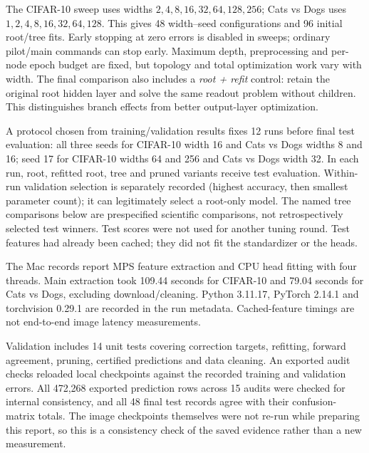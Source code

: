 \documentclass[11pt,a4paper]{article}
\begin{document}
The CIFAR-10 sweep uses widths $2,4,8,16,32,64,128,256$; Cats vs Dogs uses $1,2,4,8,16,32,64,128$. This gives 48 width--seed configurations and 96 initial root/tree fits. Early stopping at zero errors is disabled in sweeps; ordinary pilot/main commands can stop early. Maximum depth, preprocessing and per-node epoch budget are fixed, but topology and total optimization work vary with width. The final comparison also includes a \emph{root + refit} control: retain the original root hidden layer and solve the same readout problem without children. This distinguishes branch effects from better output-layer optimization.

A protocol chosen from training/validation results fixes 12 runs before final test evaluation: all three seeds for CIFAR-10 width 16 and Cats vs Dogs widths 8 and 16; seed 17 for CIFAR-10 widths 64 and 256 and Cats vs Dogs width 32. In each run, root, refitted root, tree and pruned variants receive test evaluation. Within-run validation selection is separately recorded (highest accuracy, then smallest parameter count); it can legitimately select a root-only model. The named tree comparisons below are prespecified scientific comparisons, not retrospectively selected test winners. Test scores were not used for another tuning round. Test features had already been cached; they did not fit the standardizer or the heads.

The Mac records report MPS feature extraction and CPU head fitting with four threads. Main extraction took 109.44 seconds for CIFAR-10 and 79.04 seconds for Cats vs Dogs, excluding download/cleaning. Python 3.11.17, PyTorch 2.14.1 and torchvision 0.29.1 are recorded in the run metadata. Cached-feature timings are not end-to-end image latency measurements.

Validation includes 14 unit tests covering correction targets, refitting, forward agreement, pruning, certified predictions and data cleaning. An exported audit checks reloaded local checkpoints against the recorded training and validation errors. All 472,268 exported prediction rows across 15 audits were checked for internal consistency, and all 48 final test records agree with their confusion-matrix totals. The image checkpoints themselves were not re-run while preparing this report, so this is a consistency check of the saved evidence rather than a new measurement.
\end{document}
